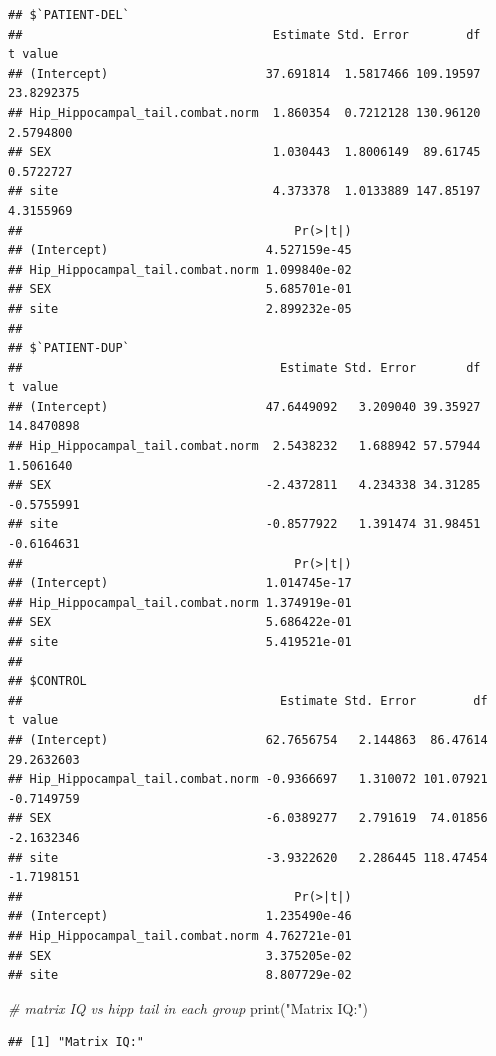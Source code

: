 \documentclass[
]{article}
\newenvironment{Shaded}{\begin{snugshade}}{\end{snugshade}}
\newcommand{\CommentTok}[1]{\textcolor[rgb]{0.56,0.35,0.01}{\textit{#1}}}
\newcommand{\FunctionTok}[1]{\textcolor[rgb]{0.00,0.00,0.00}{#1}}
\newcommand{\NormalTok}[1]{#1}
\newcommand{\StringTok}[1]{\textcolor[rgb]{0.31,0.60,0.02}{#1}}
\begin{document}
\begin{verbatim}
## $`PATIENT-DEL`
##                                   Estimate Std. Error        df    t value
## (Intercept)                      37.691814  1.5817466 109.19597 23.8292375
## Hip_Hippocampal_tail.combat.norm  1.860354  0.7212128 130.96120  2.5794800
## SEX                               1.030443  1.8006149  89.61745  0.5722727
## site                              4.373378  1.0133889 147.85197  4.3155969
##                                      Pr(>|t|)
## (Intercept)                      4.527159e-45
## Hip_Hippocampal_tail.combat.norm 1.099840e-02
## SEX                              5.685701e-01
## site                             2.899232e-05
## 
## $`PATIENT-DUP`
##                                    Estimate Std. Error       df    t value
## (Intercept)                      47.6449092   3.209040 39.35927 14.8470898
## Hip_Hippocampal_tail.combat.norm  2.5438232   1.688942 57.57944  1.5061640
## SEX                              -2.4372811   4.234338 34.31285 -0.5755991
## site                             -0.8577922   1.391474 31.98451 -0.6164631
##                                      Pr(>|t|)
## (Intercept)                      1.014745e-17
## Hip_Hippocampal_tail.combat.norm 1.374919e-01
## SEX                              5.686422e-01
## site                             5.419521e-01
## 
## $CONTROL
##                                    Estimate Std. Error        df    t value
## (Intercept)                      62.7656754   2.144863  86.47614 29.2632603
## Hip_Hippocampal_tail.combat.norm -0.9366697   1.310072 101.07921 -0.7149759
## SEX                              -6.0389277   2.791619  74.01856 -2.1632346
## site                             -3.9322620   2.286445 118.47454 -1.7198151
##                                      Pr(>|t|)
## (Intercept)                      1.235490e-46
## Hip_Hippocampal_tail.combat.norm 4.762721e-01
## SEX                              3.375205e-02
## site                             8.807729e-02
\end{verbatim}

\begin{Shaded}
\begin{Highlighting}[]
\CommentTok{\# matrix IQ vs hipp tail in each group}
\FunctionTok{print}\NormalTok{(}\StringTok{"Matrix IQ:"}\NormalTok{)}
\end{Highlighting}
\end{Shaded}

\begin{verbatim}
## [1] "Matrix IQ:"
\end{verbatim}
\end{document}

